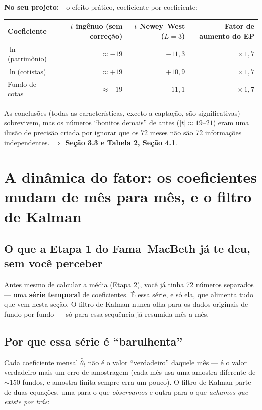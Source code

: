\documentclass[11pt,a4paper]{article}
\newcommand{\noprojeto}[0]{\par\vspace{4pt}\noindent\textbf{No seu projeto:}\ }
\begin{document}
\noprojeto\ o efeito prático, coeficiente por coeficiente:

\begin{center}\small
\begin{tabular}{@{}lrrr@{}}
\toprule
Coeficiente & $t$ ingênuo (sem correção) & $t$ Newey--West ($L=3$) & Fator de aumento do EP \\
\midrule
$\ln$(patrimônio)  & $\approx -19$ & $-11{,}3$ & $\times\,1{,}7$ \\
$\ln$(cotistas)    & $\approx +19$ & $+10{,}9$ & $\times\,1{,}7$ \\
Fundo de cotas      & $\approx -19$ & $-11{,}1$ & $\times\,1{,}7$ \\
\bottomrule
\end{tabular}
\end{center}

As conclusões (todas as características, exceto a captação, são significativas) sobrevivem, mas
os números ``bonitos demais'' de antes ($|t|\approx19$--$21$) eram uma ilusão de precisão criada
por ignorar que os 72 meses não são 72 informações independentes. $\Rightarrow$ \textbf{Seção 3.3
e Tabela 2, Seção 4.1}.

\section{A dinâmica do fator: os coeficientes mudam de mês para mês, e o filtro de Kalman}
\label{sec:kalman}

\subsection{O que a Etapa 1 do Fama--MacBeth já te deu, sem você perceber}

Antes mesmo de calcular a média (Etapa 2), você já tinha 72 números separados --- uma
\textbf{série temporal} de coeficientes. É essa série, e só ela, que alimenta tudo que vem
nesta seção. O filtro de Kalman nunca olha para os dados originais de fundo por fundo --- só
para essa sequência já resumida mês a mês.

\subsection{Por que essa série é ``barulhenta''}

Cada coeficiente mensal $\widehat\theta_t$ não é o valor ``verdadeiro'' daquele mês --- é o
valor verdadeiro mais um erro de amostragem (cada mês usa uma amostra diferente de
$\sim$150 fundos, e amostra finita sempre erra um pouco). O filtro de Kalman parte de duas
equações, uma para o que \emph{observamos} e outra para o que \emph{achamos que existe por
trás}:
\end{document}

